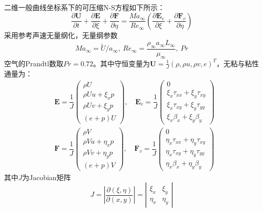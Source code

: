 \documentclass[11pt]{article}
\begin{document}
二维一般曲线坐标系下的可压缩N-S方程如下所示：
\begin{equation}
	\frac{\partial \bm{U}}{\partial t}+\frac{\partial \bm{E}}{\partial \xi}+\frac{\partial \bm{F}}{\partial \eta}=\frac{Ma_\infty}{Re_\infty}\left(\frac{\partial \bm{E}_v}{\partial \xi}+\frac{\partial \bm{F}_v}{\partial \eta}\right)
\end{equation}
采用参考声速无量纲化\citep{_gpu_2020}，无量纲参数
\begin{equation}
	Ma_\infty=\tilde{U}/a_\infty,\ Re_\infty=\frac{\rho_\infty a_\infty L_\infty}{\mu_\infty},\ Pr
\end{equation}
空气的Prandtl数取$Pr=0.72$。其中守恒变量为$\bm{U}=\frac{1}{J}\left(\rho, \rho u, \rho v, e\right)^T$，无粘与粘性通量为：
\begin{align}
	 & \bm{E}=\dfrac{1}{J}\left(\begin{matrix}
			\rho U          \\
			\rho Uu+\xi_x p \\
			\rho Uv+\xi_y p \\
			(e+p)U
		\end{matrix}\right),\quad
	\bm{E}_v=\dfrac{1}{J}\left(\begin{matrix}
			0                             \\
			\xi_x\tau_{xx}+\xi_y\tau_{xy} \\
			\xi_x\tau_{xy}+\xi_y\tau_{yy} \\
			\xi_x\beta_{x}+\xi_y\beta_{y}
		\end{matrix}\right)        \\
	 & \bm{F}=\dfrac{1}{J}\left(\begin{matrix}
			\rho V           \\
			\rho Vu+\eta_x p \\
			\rho Vv+\eta_y p \\
			(e+p)V
		\end{matrix}\right),\quad
	\bm{F}_v=\dfrac{1}{J}\left(\begin{matrix}
			0                               \\
			\eta_x\tau_{xx}+\eta_y\tau_{xy} \\
			\eta_x\tau_{xy}+\eta_y\tau_{yy} \\
			\eta_x\beta_{x}+\eta_y\beta_{y}
		\end{matrix}\right)
\end{align}
其中$J$为Jacobian矩阵
\begin{equation}
	J=\left|\frac{\partial(\xi,\eta)}{\partial(x,y)}\right|=
	\left|\begin{matrix}
		\xi_x  & \xi_y  \\
		\eta_x & \eta_y
	\end{matrix}\right|
\end{equation}
\end{document}

